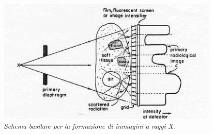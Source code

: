 \documentclass{report}
\numberwithin{equation}{section}
\numberwithin{figure}{section}
\begin{document}
\begin{figure}[htp]
\centering
\includegraphics[scale=0.8]{immagini/radiografia.png}
\caption{\label{fig:radiografia} \textit{Schema basilare per la formazione di immagini a raggi X}.}
\end{figure}
\end{document}
